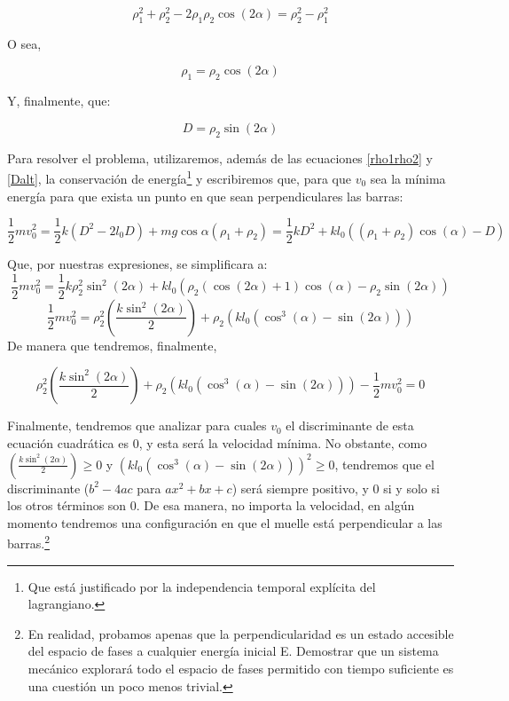 \documentclass[a4paper,12pt]{article}
\begin{document}
$$\rho_1^2 + \rho_2^2 -2\rho_1\rho_2\cos(2\alpha) = \rho_2^2 - \rho_1^2 $$

O sea,

\begin{equation}
  \label{rho1rho2}
  \rho_1 = \rho_2 \cos(2\alpha)
\end{equation}

Y, finalmente, que:

\begin{equation}
  \label{Dalt}
  D = \rho_2 \sin(2\alpha)
\end{equation}

Para resolver el problema, utilizaremos, además de las ecuaciones \eqref{rho1rho2} y \eqref{Dalt}, la conservación de energía\footnote{Que está justificado por la independencia temporal explícita del lagrangiano.} y escribiremos que, para que $v_{0}$ sea la mínima energía para que exista un punto en que sean perpendiculares las barras:

$$\frac{1}{2}m v_0^2 = \frac{1}{2}k(D^2-2l_0D)+mg\cos{\alpha}(\rho_1 + \rho_2)  = \frac{1}{2}k D^2 + kl_{0}((\rho_1 + \rho_2 )\cos(\alpha)-D)$$

Que, por nuestras expresiones, se simplificara a:
$$\frac{1}{2}m v_0^2 = \frac{1}{2}k\rho_2^2 \sin^2(2\alpha) + kl_{0}(\rho_2(\cos(2\alpha) + 1)\cos(\alpha) -\rho_2 \sin(2\alpha))$$
$$ \frac{1}{2}m v_0^2 = \rho_2^2 \left(\frac{k\sin^2(2\alpha)}{2}\right) + \rho_2\left(kl_0(\cos^3(\alpha)-\sin(2\alpha))\right) $$
De manera que tendremos, finalmente,

\begin{equation}
  \rho_2^2 \left(\frac{k\sin^2(2\alpha)}{2}\right) + \rho_2\left(kl_0(\cos^3(\alpha)-\sin(2\alpha))\right) - \frac{1}{2}m v_0^2 = 0
\end{equation}

Finalmente, tendremos que analizar para cuales $v_{0}$ el discriminante de esta ecuación cuadrática es 0, y esta será la velocidad mínima. No obstante, como $\left(\frac{k\sin^2(2\alpha)}{2}\right) \ge  0$ y  $\left(kl_0(\cos^3(\alpha)-\sin(2\alpha))\right)^{2} \ge 0$, tendremos que el discriminante ($b^2 -4ac$ para $ax^2 +bx + c$) será siempre positivo, y 0 si y solo si los otros términos son 0. De esa manera, no importa la velocidad, en algún momento tendremos una configuración en que el muelle está perpendicular a las barras.\footnote{En realidad, probamos apenas que la perpendicularidad es un estado accesible del espacio de fases a cualquier energía inicial E. Demostrar que un sistema mecánico explorará todo el espacio de fases permitido con tiempo suficiente es una cuestión un poco menos trivial.}
\end{document}
